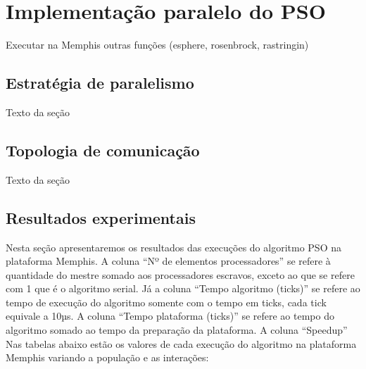 \chapter{Implementação paralelo do PSO}

Executar na Memphis outras funções (esphere, rosenbrock, rastringin)

\section{Estratégia de paralelismo}

Texto da seção

\section{Topologia de comunicação}

Texto da seção

\section{Resultados experimentais}

Nesta seção apresentaremos os resultados das execuções do algoritmo PSO na plataforma Memphis.
A coluna “Nº de elementos processadores” se refere à quantidade do mestre somado aos processadores escravos, exceto ao que se refere com 1 que é o algoritmo serial. Já a coluna “Tempo algoritmo (ticks)” se refere ao tempo de execução do algoritmo somente com o tempo em ticks, cada tick equivale a 10µs. A coluna “Tempo plataforma (ticks)” se refere ao tempo do algoritmo somado ao tempo da preparação da plataforma. A coluna “Speedup”
Nas tabelas abaixo estão os valores de cada execução do algoritmo na plataforma Memphis variando a população e as interações:



